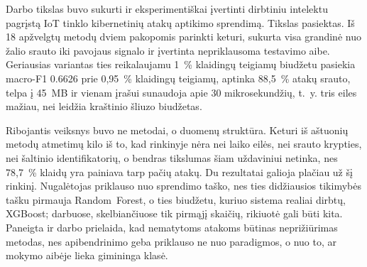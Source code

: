 
Darbo tikslas buvo sukurti ir eksperimentiškai įvertinti dirbtiniu
intelektu pagrįstą IoT tinklo kibernetinių atakų aptikimo sprendimą.
Tikslas pasiektas. Iš 18 apžvelgtų metodų dviem pakopomis parinkti
keturi, sukurta visa grandinė nuo žalio srauto iki pavojaus signalo ir
įvertinta nepriklausoma testavimo aibe. Geriausias variantas ties
reikalaujamu 1~\% klaidingų teigiamų biudžetu pasiekia macro-F1
\num{0.6626} prie 0,95~\% klaidingų teigiamų, aptinka 88,5~\% atakų
srauto, telpa į 45~MB ir vienam įrašui sunaudoja apie 30 mikrosekundžių,
t.~y. tris eiles mažiau, nei leidžia kraštinio šliuzo biudžetas.

Ribojantis veiksnys buvo ne metodai, o duomenų struktūra. Keturi iš
aštuonių metodų atmetimų kilo iš to, kad rinkinyje nėra nei laiko eilės,
nei srauto krypties, nei šaltinio identifikatorių, o bendras tikslumas
šiam uždaviniui netinka, nes 78,7~\% klaidų yra painiava tarp pačių
atakų. Du rezultatai galioja plačiau už šį rinkinį. Nugalėtojas
priklauso nuo sprendimo taško, nes ties didžiausios tikimybės tašku
pirmauja Random~Forest, o ties biudžetu, kuriuo sistema realiai dirbtų,
XGBoost; darbuose, skelbiančiuose tik pirmąjį skaičių, rikiuotė gali
būti kita. Paneigta ir darbo prielaida, kad nematytoms atakoms būtinas
neprižiūrimas metodas, nes apibendrinimo geba priklauso ne nuo
paradigmos, o nuo to, ar mokymo aibėje lieka gimininga klasė.
